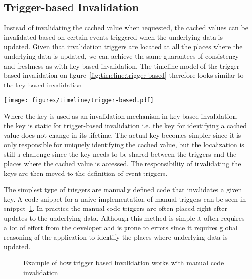 

\subsection{Trigger-based Invalidation}
\label{subsec:trigger_based_invalidation}

Instead of invalidating the cached value when requested, the cached values can be invalidated based on certain events triggered when the underlying data is updated. Given that invalidation triggers are located at all the places where the underlying data is updated, we can achieve the same guarantees of consistency and freshness as with key-based invalidation. The timeline model of the trigger-based invalidation on figure~\ref{fig:timeline:trigger-based} therefore looks similar to the key-based invalidation.

\begin{figure*}[ht!]
  \centering
  \texttt{[image: figures/timeline/trigger-based.pdf]}
  \caption{The lifecycle of the expiration-based invalidation technique}
  \label{fig:timeline:trigger-based}
\end{figure*}

Where the key is used as an invalidation mechanism in key-based invalidation, the key is static for trigger-based invalidation i.e. the key for identifying a cached value does not change in its lifetime. The actual key becomes simpler since it is only responsible for uniquely identifying the cached value, but the localization is still a challenge since the key needs to be shared between the triggers and the places where the cached value is accessed. The responsibility of invalidating the keys are then moved to the definition of event triggers.

The simplest type of triggers are manually defined code that invalidates a given key. A code snippet for a naive implementation of manual triggers can be seen in snippet~\ref{code:manual-trigger-invalidation}. In practice the manual code triggers are often placed right after updates to the underlying data. Although this method is simple it often requires a lot of effort from the developer and is prone to errors since it requires global reasoning of the application to identify the places where underlying data is updated.

\begin{figure}

\caption{Example of how trigger based invalidation works with manual code invalidation}
\label{code:manual-trigger-invalidation}
\end{figure}

